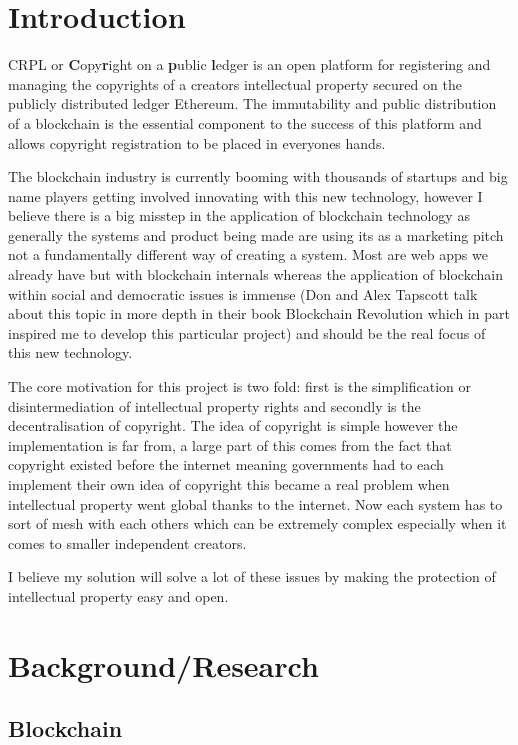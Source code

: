 \documentclass[12pt]{report}
\begin{document}
\chapter{Introduction}

CRPL or \textbf{C}opy\textbf{r}ight on a \textbf{p}ublic \textbf{l}edger is an open platform for registering and managing the copyrights of a creators intellectual property secured on the publicly distributed ledger Ethereum. The immutability and public distribution of a blockchain is the essential component to the success of this platform and allows copyright registration to be placed in everyones hands.

The blockchain industry is currently booming with thousands of startups and big name players getting involved innovating with this new technology, however I believe there is a big misstep in the application of blockchain technology as generally the systems and product being made are using its as a marketing pitch not a fundamentally different way of creating a system. Most are web apps we already have but with blockchain internals whereas the application of blockchain within social and democratic issues is immense (Don and Alex Tapscott talk about this topic in more depth in their book Blockchain Revolution\cite{blockchain_revolution} which in part inspired me to develop this particular project) and should be the real focus of this new technology.

The core motivation for this project is two fold: first is the simplification or disintermediation of intellectual property rights and secondly is the decentralisation of copyright. The idea of copyright is simple however the implementation is far from, a large part of this comes from the fact that copyright existed before the internet meaning governments had to each implement their own idea of copyright this became a real problem when intellectual property went global thanks to the internet. Now each system has to sort of mesh with each others which can be extremely complex especially when it comes to smaller independent creators.

I believe my solution will solve a lot of these issues by making the protection of intellectual property easy and open.

\chapter{Background/Research}

\section{Blockchain}
\end{document}
